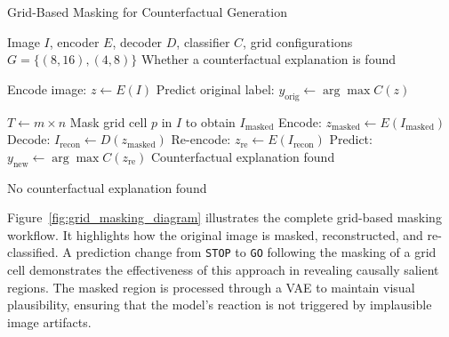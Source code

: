 \vspace{1em}
\begin{algorithm}[htbp]
\caption{Grid-Based Masking for Counterfactual Generation}
\label{alg:grid_based_masking}
\begin{algorithmic}[1]
\REQUIRE Image $I$, encoder $E$, decoder $D$, classifier $C$, grid configurations $G = \{(8,16), (4,8)\}$
\ENSURE Whether a counterfactual explanation is found

\STATE Encode image: $z \leftarrow E(I)$
\STATE Predict original label: $y_{\text{orig}} \leftarrow \arg\max C(z)$

    \STATE $T \leftarrow m \times n$
        \STATE Mask grid cell $p$ in $I$ to obtain $I_{\text{masked}}$
        \STATE Encode: $z_{\text{masked}} \leftarrow E(I_{\text{masked}})$
        \STATE Decode: $I_{\text{recon}} \leftarrow D(z_{\text{masked}})$
        \STATE Re-encode: $z_{\text{re}} \leftarrow E(I_{\text{recon}})$
        \STATE Predict: $y_{\text{new}} \leftarrow \arg\max C(z_{\text{re}})$
            \RETURN Counterfactual explanation found
        \ENDIF
    \ENDFOR
\ENDFOR

\RETURN No counterfactual explanation found
\end{algorithmic}
\end{algorithm}


Figure~\ref{fig:grid_masking_diagram} illustrates the complete grid-based masking workflow. It highlights how the original image is masked, reconstructed, and re-classified. A prediction change from \texttt{STOP} to \texttt{GO} following the masking of a grid cell demonstrates the effectiveness of this approach in revealing causally salient regions. The masked region is processed through a VAE to maintain visual plausibility, ensuring that the model’s reaction is not triggered by implausible image artifacts.

